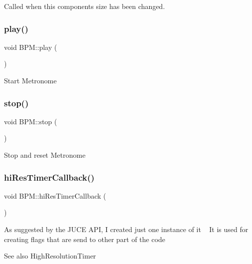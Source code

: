 Called when this component\textquotesingle{}s size has been changed. \mbox{\label{class_b_p_m_a837ba2795fae0a7db5bd3e5abbac7a3d}} 
\subsubsection{\texorpdfstring{play()}{play()}}
{\footnotesize\ttfamily void B\+P\+M\+::play (\begin{DoxyParamCaption}{ }\end{DoxyParamCaption})}

Start Metronome \mbox{\label{class_b_p_m_ac48f4b87539a26b6139f9718af9bb173}} 
\subsubsection{\texorpdfstring{stop()}{stop()}}
{\footnotesize\ttfamily void B\+P\+M\+::stop (\begin{DoxyParamCaption}{ }\end{DoxyParamCaption})}

Stop and reset Metronome \mbox{\label{class_b_p_m_a01df6c7612ab9433bd6fa9f2a954bab4}} 
\subsubsection{\texorpdfstring{hiResTimerCallback()}{hiResTimerCallback()}}
{\footnotesize\ttfamily void B\+P\+M\+::hi\+Res\+Timer\+Callback (\begin{DoxyParamCaption}{ }\end{DoxyParamCaption})\hspace{0.3cm}{\ttfamily [override]}}

As suggested by the J\+U\+CE A\+PI, I created just one instance of it ~\newline
 It is used for creating flags that are send to other part of the code ~\newline
\begin{DoxySeeAlso}{See also}
High\+Resolution\+Timer 
\end{DoxySeeAlso}
\mbox{\label{class_b_p_m_aa7ecb3bca0891551f3c62421eb9fe737}} 
